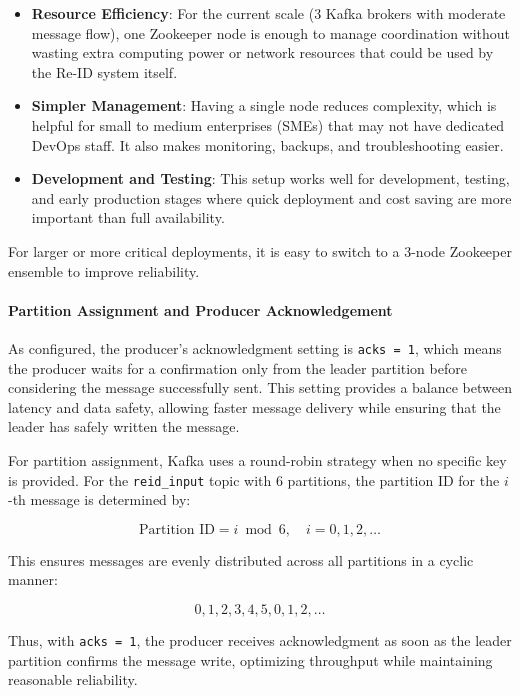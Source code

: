 \begin{itemize}
    \item \textbf{Resource Efficiency}: For the current scale (3 Kafka brokers with moderate message flow), one Zookeeper node is enough to manage coordination without wasting extra computing power or network resources that could be used by the Re-ID system itself.
    
    \item \textbf{Simpler Management}: Having a single node reduces complexity, which is helpful for small to medium enterprises (SMEs) that may not have dedicated DevOps staff. It also makes monitoring, backups, and troubleshooting easier.
    
    \item \textbf{Development and Testing}: This setup works well for development, testing, and early production stages where quick deployment and cost saving are more important than full availability.
\end{itemize}

For larger or more critical deployments, it is easy to switch to a 3-node Zookeeper ensemble to improve reliability.

\paragraph{Partition Assignment and Producer Acknowledgement}

As configured, the producer's acknowledgment setting is \texttt{acks = 1}, which means the producer waits for a confirmation only from the leader partition before considering the message successfully sent. This setting provides a balance between latency and data safety, allowing faster message delivery while ensuring that the leader has safely written the message.

For partition assignment, Kafka uses a round-robin strategy when no specific key is provided. For the \texttt{reid\_input} topic with 6 partitions, the partition ID for the \(i\)-th message is determined by:

\begin{equation}
    \text{Partition ID} = i \bmod 6, \quad i = 0, 1, 2, \ldots
\end{equation}

This ensures messages are evenly distributed across all partitions in a cyclic manner:

\[
0, 1, 2, 3, 4, 5, 0, 1, 2, \ldots
\]

Thus, with \texttt{acks = 1}, the producer receives acknowledgment as soon as the leader partition confirms the message write, optimizing throughput while maintaining reasonable reliability.

